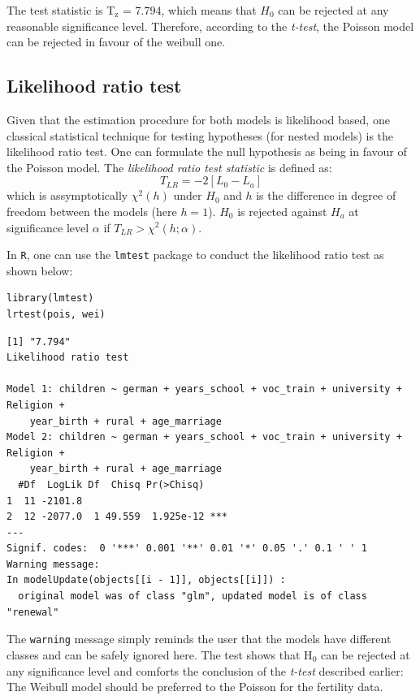 \documentclass[a4paper,twoside,11pt]{article}
\begin{document}
The test statistic is
T\(_{\text{z}}\) = 7.794,
which means that \(H_0\) can be rejected at any reasonable significance
level. Therefore, according to the \emph{t-test}, the Poisson model can be rejected
in favour of the weibull one.


\subsection{Likelihood ratio test}
\label{sec:org3eb7809}

Given that the estimation procedure for both models is likelihood based, one
classical statistical technique for testing hypotheses (for nested models) is the
likelihood ratio test. One can formulate the null hypothesis as being in favour
of the Poisson model. The \emph{likelihood ratio test statistic} is defined as:
\begin{equation}
    T_{LR} = -2[L_0 - L_a]
 \end{equation}
which is assymptotically \(\chi^2(h)\) under \(H_0\) and \(h\) is the difference in
degree of freedom between the models (here \(h=1\)). \(H_0\) is rejected against
\(H_a\) at significance level \(\alpha\) if \(T_{LR} > \chi^2(h;\alpha)\).

In \texttt{R}, one can use the \texttt{lmtest} package \citep{lmtest2002} to conduct the
likelihood ratio test as shown below:

\begin{verbatim}
library(lmtest)
lrtest(pois, wei)
\end{verbatim}

\begin{verbatim}
[1] "7.794"
Likelihood ratio test

Model 1: children ~ german + years_school + voc_train + university + Religion + 
    year_birth + rural + age_marriage
Model 2: children ~ german + years_school + voc_train + university + Religion + 
    year_birth + rural + age_marriage
  #Df  LogLik Df  Chisq Pr(>Chisq)    
1  11 -2101.8                         
2  12 -2077.0  1 49.559  1.925e-12 ***
---
Signif. codes:  0 '***' 0.001 '**' 0.01 '*' 0.05 '.' 0.1 ' ' 1
Warning message:
In modelUpdate(objects[[i - 1]], objects[[i]]) :
  original model was of class "glm", updated model is of class "renewal"
\end{verbatim}

The \texttt{warning} message simply reminds the user that the models have different
classes and can be safely ignored here. The test shows that H\(_{\text{0}}\) can be rejected
at any significance level and comforts the conclusion of the \emph{t-test} described
earlier: The Weibull model should be preferred to the Poisson for the fertility
data.
\end{document}
